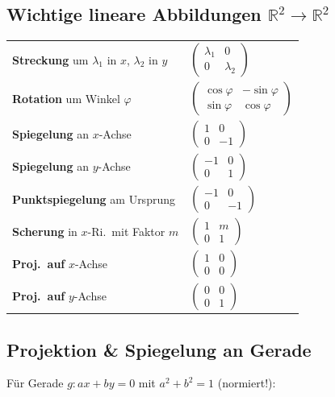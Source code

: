 \subsection{Wichtige lineare Abbildungen $\mathbb{R}^2 \to \mathbb{R}^2$}

\begin{tabular}{@{}ll@{}}
\textbf{Streckung} um $\lambda_1$ in $x$, $\lambda_2$ in $y$ & $\begin{pmatrix} \lambda_1 & 0 \\ 0 & \lambda_2 \end{pmatrix}$ \\[8pt]
\textbf{Rotation} um Winkel $\varphi$ & $\begin{pmatrix} \cos\varphi & -\sin\varphi \\ \sin\varphi & \cos\varphi \end{pmatrix}$ \\[8pt]
\textbf{Spiegelung} an $x$-Achse & $\begin{pmatrix} 1 & 0 \\ 0 & -1 \end{pmatrix}$ \\[8pt]
\textbf{Spiegelung} an $y$-Achse & $\begin{pmatrix} -1 & 0 \\ 0 & 1 \end{pmatrix}$ \\[8pt]
\textbf{Punktspiegelung} am Ursprung & $\begin{pmatrix} -1 & 0 \\ 0 & -1 \end{pmatrix}$ \\[8pt]
\textbf{Scherung} in $x$-Ri.\ mit Faktor $m$ & $\begin{pmatrix} 1 & m \\ 0 & 1 \end{pmatrix}$ \\[8pt]
\textbf{Proj.\ auf} $x$-Achse & $\begin{pmatrix} 1 & 0 \\ 0 & 0 \end{pmatrix}$ \\[8pt]
\textbf{Proj.\ auf} $y$-Achse & $\begin{pmatrix} 0 & 0 \\ 0 & 1 \end{pmatrix}$
\end{tabular}

\subsection{Projektion \& Spiegelung an Gerade}
Für Gerade $g: ax + by = 0$ mit $a^2 + b^2 = 1$ (normiert!):

